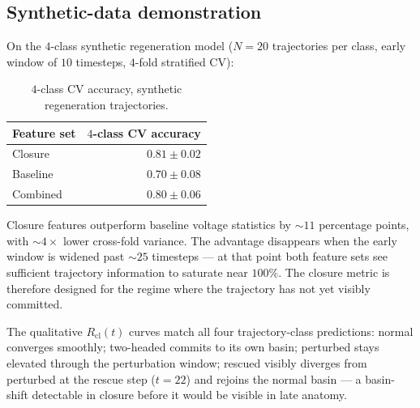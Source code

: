 \documentclass[11pt,a4paper]{article}
\begin{document}
\subsection{Synthetic-data demonstration}\label{sec:synth}

On the $4$-class synthetic regeneration model ($N=20$ trajectories per class, early window of $10$ timesteps, $4$-fold stratified CV):

\begin{table}[h]\centering\small
\caption{$4$-class CV accuracy, synthetic regeneration trajectories.}\label{tab:synth}
\begin{tabular}{lr}\toprule
Feature set & $4$-class CV accuracy \\
\midrule
Closure  & $\mathbf{0.81 \pm 0.02}$ \\
Baseline & $0.70 \pm 0.08$ \\
Combined & $0.80 \pm 0.06$ \\
\bottomrule\end{tabular}
\end{table}

Closure features outperform baseline voltage statistics by $\sim$$11$ percentage points, with $\sim$$4\times$ lower cross-fold variance. The advantage disappears when the early window is widened past $\sim$$25$ timesteps --- at that point both feature sets see sufficient trajectory information to saturate near $100\%$. The closure metric is therefore designed for the regime where the trajectory has not yet visibly committed.

The qualitative $R_{\mathrm{cl}}(t)$ curves match all four trajectory-class predictions: normal converges smoothly; two-headed commits to its own basin; perturbed stays elevated through the perturbation window; rescued visibly diverges from perturbed at the rescue step ($t=22$) and rejoins the normal basin --- a basin-shift detectable in closure before it would be visible in late anatomy.
\end{document}
